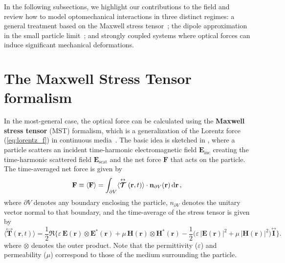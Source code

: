  In the following subsections, we highlight our contributions to the field and review how to model optomechanical interactions in three distinct regimes: a general treatment based on the Maxwell stress tensor~\cite{ownpub2}; 
 the dipole approximation in the small particle limit~\cite{ownpub1, ownpub3}; and strongly coupled systems where optical forces can induce significant mechanical deformations.
\section{The Maxwell Stress Tensor formalism~\cite{ownpub2}}\label{sec:engi}

In the most-general case, the optical force can be calculated using the \textbf{Maxwell stress tensor} (MST) formalism, which is a generalization of the Lorentz force (\eqref{eq:lorentz_f}) in continuous media~\cite{novotny}.
The basic idea is sketched in , where
a particle scatters an incident time-harmonic electromagnetic field $\mathbf{E}_\text{inc}$ creating the time-harmonic scattered field $\mathbf{E}_\text{scat}$ and the net force $\mathbf{F}$ that acts
on the particle. The time-averaged net force is given by~\cite{novotny}
\begin{equation}\label{eq:f_MST}
    \mathbf{F} \equiv \langle\mathbf{F}\rangle=\int_{\partial V}\langle\stackrel{\leftrightarrow}{\bm{\mathcal{T}}}(\mathbf{r}, t)\rangle \cdot \mathbf{n}_{\partial V}(\mathbf{r}) \mathop{}\!\text{d} \mathbf{r}\,,
\end{equation}
where $\partial V$ denotes any boundary enclosing the particle, $n_{\partial V}$ denotes the unitary vector normal to that boundary, and
the time-average of the stress tensor is given by
\begin{equation}
        \langle \stackrel{\leftrightarrow}{\mathbf{T}}(\mathbf{r}, t) \rangle 
        = \frac{1}{2} \Re \Big\{ 
            \varepsilon\, \mathbf{E}(\mathbf{r}) \otimes \mathbf{E}^*(\mathbf{r})
            + \mu\, \mathbf{H}(\mathbf{r}) \otimes \mathbf{H}^*(\mathbf{r})
         - \frac{1}{2} \big( \varepsilon\, |\mathbf{E}(\mathbf{r})|^2 + \mu\, |\mathbf{H}(\mathbf{r})|^2 \big) 
        \stackrel{\leftrightarrow}{\mathbf{I}} \Big\}.
\end{equation}
where $\otimes$ denotes the outer product. Note that the permittivity ($\varepsilon$) and permeability ($\mu$) correspond to those of the medium surrounding the particle.

